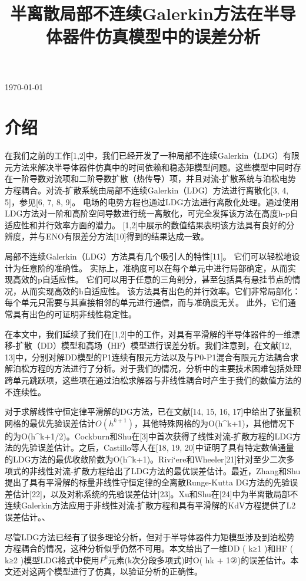 \documentclass[lang=cn,newtx,10pt,scheme=chinese]{elegantbook}
\title{半离散局部不连续Galerkin方法在半导体器件仿真模型中的误差分析}
\begin{document}
\maketitle

\frontmatter

\tableofcontents

\mainmatter

\today
\section{介绍}
在我们之前的工作[1,2]中，我们已经开发了一种局部不连续Galerkin（LDG）有限元方法来解决半导体器件仿真中的时间依赖和稳态矩模型问题。这些模型中同时存在一阶导数对流项和二阶导数扩散（热传导）项，并且对流-扩散系统与泊松电势方程耦合。对流-扩散系统由局部不连续Galerkin（LDG）方法进行离散化[3, 4, 5]，参见[6, 7, 8, 9]。
电场的电势方程也通过LDG方法进行离散化处理。通过使用LDG方法对一阶和高阶空间导数进行统一离散化，可完全发挥该方法在高度h-p自适应性和并行效率方面的潜力。
[1,2]中展示的数值结果表明该方法具有良好的分辨度，并与ENO有限差分方法[10]得到的结果达成一致。

局部不连续Galerkin（LDG）方法具有几个吸引人的特性[11]。
它们可以轻松地设计为任意阶的准确性。
实际上，准确度可以在每个单元中进行局部确定，从而实现高效的p自适应性。
它们可以用于任意的三角剖分，甚至包括具有悬挂节点的情况，从而实现高效的h自适应性。
该方法具有出色的并行效率。它们非常局部化：每个单元只需要与其直接相邻的单元进行通信，而与准确度无关。
此外，它们通常具有出色的可证明非线性稳定性。

在本文中，我们延续了我们在[1,2]中的工作，对具有平滑解的半导体器件的一维漂移-扩散（DD）模型和高场（HF）模型进行误差分析。我们注意到，在文献[12, 13]中，分别对解DD模型的P1连续有限元方法以及与P0-P1混合有限元方法耦合求解泊松方程的方法进行了分析。对于我们的情况，分析中的主要技术困难包括处理跨单元跳跃项，这些项在通过泊松求解器与非线性耦合时产生于我们的数值方法的不连续性。

对于求解线性守恒定律平滑解的DG方法，已在文献[14, 15, 16, 17]中给出了张量积网格的最优先验误差估计$O(h^{k+1})$，其他特殊网格的为O(h^{k+1})，其他情况下的为O(h^{k+1/2})。Cockburn和Shu在[3]中首次获得了线性对流-扩散方程的LDG方法的先验误差估计。之后，Castillo等人在[18, 19, 20]中证明了具有特定数值通量的LDG方法的最优收敛阶数为O(h^{k+1})。Rivi`ere和Wheeler[21]针对至少二次多项式的非线性对流-扩散方程给出了LDG方法的最优误差估计。最近，Zhang和Shu提出了具有平滑解的标量非线性守恒定律的全离散Runge-Kutta DG方法的先验误差估计[22]，以及对称系统的先验误差估计[23]。Xu和Shu在[24]中为半离散局部不连续Galerkin方法应用于非线性对流-扩散方程和具有平滑解的KdV方程提供了L2误差估计。、

尽管LDG方法已经有了很多理论分析，但对于半导体器件力矩模型涉及到泊松势方程耦合的情况，这种分析似乎仍然不可用。本文给出了一维DD ( k≥1 )和HF ( k≥2 )模型LDG格式中使用$P^k$元素(k次分段多项式)时O( hk + 1②)的误差估计。本文还对这两个模型进行了仿真，以验证分析的正确性。
\end{document}
